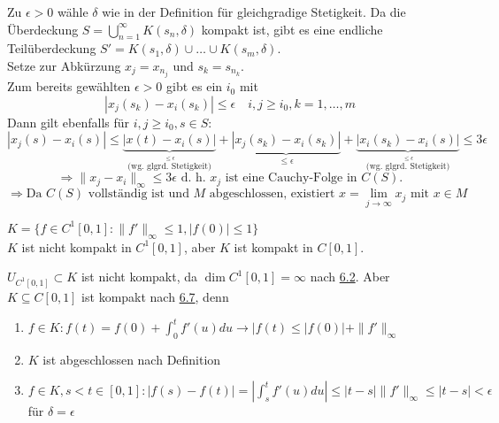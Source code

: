 \begin{beweis}
	Zu $\epsilon > 0$ wähle $\delta$ wie in der Definition für gleichgradige Stetigkeit.
	Da die Überdeckung $S = \bigcup_{n = 1}^{\infty} K(s_{n}, \delta)$ kompakt ist, gibt es eine endliche Teilüberdeckung $S' = K(s_1, \delta) \cup \dotsc \cup K(s_{m}, \delta)$. \\
	Setze zur Abkürzung $x_{j} = x_{n_{j}}$ und $s_{k} = s_{n_{k}}$. \\
	Zum bereits gewählten $\epsilon > 0$ gibt es ein $i_{0}$ mit 
	\[ | x_{j}(s_{k}) - x_{i}(s_{k}) | \leq \epsilon \quad i, j \geq i_{0}, k = 1, \dotsc, m \]
	Dann gilt ebenfalls für $i, j \geq i_{0}, s \in S$: \\
	\[ | x_{j}(s) - x_{i}(s) | \leq \underbrace{| x(t) - x_{i}(s) |}_{\overset{\leq \epsilon}{\text{(wg. glgrd. Stetigkeit)}}} + \underbrace{| x_{j}(s_{k}) - x_{i}(s_{k}) |}_{\leq \epsilon} + \underbrace{| x_{i}(s_{k}) - x_{i}(s) |}_{\overset{\leq \epsilon}{\text{(wg. glgrd. Stetigkeit)}}} \leq 3 \epsilon \]
	\[ \Rightarrow \| x_{j} - x_{i}\|_{\infty} \leq 3 \epsilon \text{ d. h. } x_{j} \text{ ist eine Cauchy-Folge in } C(S). \]
	\[ \Rightarrow \text{Da } C(S) \text{ vollständig ist und } M \text{ abgeschlossen, existiert } x = \lim_{j \rightarrow \infty} x_{j} \text{ mit } x \in M \]
\end{beweis}


\begin{beispiel}
	$K = \{ f \in C^{1}[0, 1]: \| f' \|_{\infty} \leq 1, | f(0) | \leq 1 \}$ \\
	$K$ ist nicht kompakt in $C^{1}[0, 1]$, aber $K$ ist kompakt in $C[0, 1]$.	
\end{beispiel}

\begin{beweis}
	$U_{C^{1}[0, 1]} \subset K$ ist nicht kompakt, da $\dim C^{1}[0, 1] = \infty$ nach \hyperref[satz:6.2]{6.2}. Aber $K \subseteq C[0, 1]$ ist kompakt nach \hyperref[satz:6.7-ArzelaAscoli]{6.7}, denn 
	\begin{enumerate}[label=\alph*\upshape)]
		\item $f \in K: f(t) = f(0) + \int_{0}^{t} f'(u) du \rightarrow |f(t) \leq |f(0)| + \| f' \|_{\infty}$
		\item $K$ ist abgeschlossen nach Definition
		\item $f \in K, s < t \in [0, 1]: |f(s) - f(t)| = | \int_{s}^{t} f'(u) du | \leq |t-s| \|f'\|_{\infty} \leq | t - s| < \epsilon$ für $\delta = \epsilon$
	\end{enumerate}
\end{beweis}


